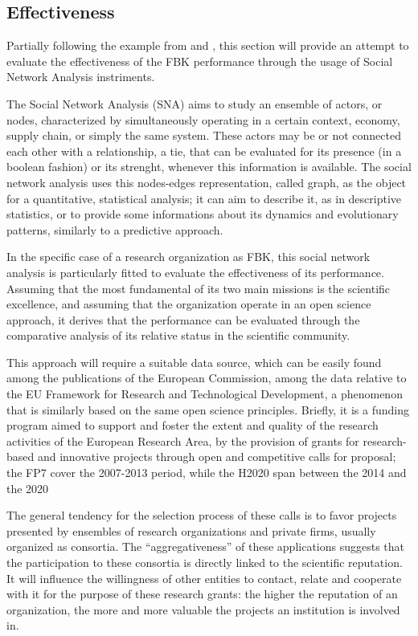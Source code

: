 \subsection{Effectiveness}

Partially following the example from \citet{Giuliani2005} and \citet{Cantner2006}, this section will provide an attempt to evaluate the effectiveness of the FBK performance through the usage of Social Network Analysis instriments. 

The Social Network Analysis (SNA) aims to study an ensemble of actors, or nodes, characterized by simultaneously operating in a certain context, economy, supply chain, or simply the same system. These actors may be or not connected each other with a relationship, a tie, that can be evaluated for its presence (in a boolean fashion) or its strenght, whenever this information is available. The social network analysis uses this nodes-edges representation, called graph, as the object for a quantitative, statistical analysis; it can aim to describe it, as in descriptive statistics, or to provide some informations about its dynamics and evolutionary patterns, similarly to a predictive approach.

In the specific case of a research organization as FBK, this social network analysis is particularly fitted to evaluate the effectiveness of its performance. Assuming that the most fundamental of its two main missions is the scientific excellence, and assuming that the organization operate in an open science approach, it derives that the performance can be evaluated through the comparative analysis of its relative status in the scientific community.

This approach will require a suitable data source, which can be easily found among the publications of the European Commission, among the data relative to the EU Framework for Research and Technological Development, a phenomenon that is similarly based on the same open science principles. Briefly, it is a funding program aimed to support and foster the extent and quality of the research activities of the European Research Area, by the provision of grants for research-based and innovative projects through open and competitive calls for proposal; the FP7 cover the 2007-2013 period, while the H2020 span between the 2014 and the 2020

The general tendency for the selection process of these calls is to favor projects presented by ensembles of research organizations and private firms, usually organized as consortia. The \enquote{aggregativeness} of these applications suggests that the participation to these consortia is directly linked to the scientific reputation. It will influence the willingness of other entities to contact, relate and cooperate with it for the purpose of these research grants: the higher the reputation of an organization, the more and more valuable the projects an institution is involved in.

